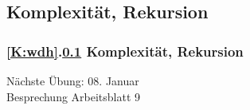 \documentclass[9pt,german]{beamer}%
\begin{document}
\def\stitle{Komplexit\"at, Rekursion}
\subsection{\stitle}\label{S:Rek}
\begin{frame}[t]%
  \frametitle{\ref{K:wdh}.\ref{S:Rek} \stitle}
\medskip


\end{frame}


\setcounter{exercise}{30}

\setcounter{exercise}{31}

\setcounter{exercise}{32}



\begin{frame}
\centering
\Huge{}
\vspace{2cm}

{\LARGE
N\"achste \"Ubung: 08. Januar\\
Besprechung Arbeitsblatt 9
}
\end{frame}


\end{document}
